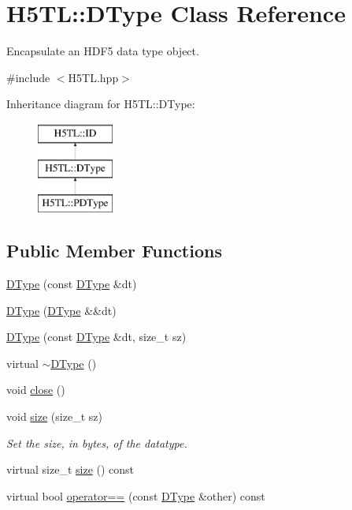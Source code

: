 \hypertarget{class_h5_t_l_1_1_d_type}{\section{H5\-T\-L\-:\-:D\-Type Class Reference}
\label{class_h5_t_l_1_1_d_type}
}


Encapsulate an H\-D\-F5 data type object.  




{\ttfamily \#include $<$H5\-T\-L.\-hpp$>$}

Inheritance diagram for H5\-T\-L\-:\-:D\-Type\-:\begin{figure}[H]
\begin{center}
\leavevmode
\includegraphics[height=3.000000cm]{class_h5_t_l_1_1_d_type}
\end{center}
\end{figure}
\subsection*{Public Member Functions}
\begin{DoxyCompactItemize}
\item 
\hyperlink{class_h5_t_l_1_1_d_type_a5ba85ceb49042ecd7c9a536d3342a143}{D\-Type} (const \hyperlink{class_h5_t_l_1_1_d_type}{D\-Type} \&dt)
\item 
\hyperlink{class_h5_t_l_1_1_d_type_a2e4087bdb1aae026237ac05894e559b9}{D\-Type} (\hyperlink{class_h5_t_l_1_1_d_type}{D\-Type} \&\&dt)
\item 
\hyperlink{class_h5_t_l_1_1_d_type_a11fb262f22fd509d1fb047120c5b0a92}{D\-Type} (const \hyperlink{class_h5_t_l_1_1_d_type}{D\-Type} \&dt, size\-\_\-t sz)
\item 
virtual \hyperlink{class_h5_t_l_1_1_d_type_a693b78e01470174565503241195fa7d9}{$\sim$\-D\-Type} ()
\item 
void \hyperlink{class_h5_t_l_1_1_d_type_a0839ae0745f1ed4f15bfe521f14e983e}{close} ()
\item 
void \hyperlink{class_h5_t_l_1_1_d_type_a16e2caeb17c88224bb286201d1b6463c}{size} (size\-\_\-t sz)
\begin{DoxyCompactList}\small\item\em Set the size, in bytes, of the datatype. \end{DoxyCompactList}\item 
virtual size\-\_\-t \hyperlink{class_h5_t_l_1_1_d_type_a1ece4a21faeb565b63695521a0cf0767}{size} () const 
\item 
virtual bool \hyperlink{class_h5_t_l_1_1_d_type_af32cf33b4b23e8326ea7134fac1fa6b8}{operator==} (const \hyperlink{class_h5_t_l_1_1_d_type}{D\-Type} \&other) const 
\end{DoxyCompactItemize}
